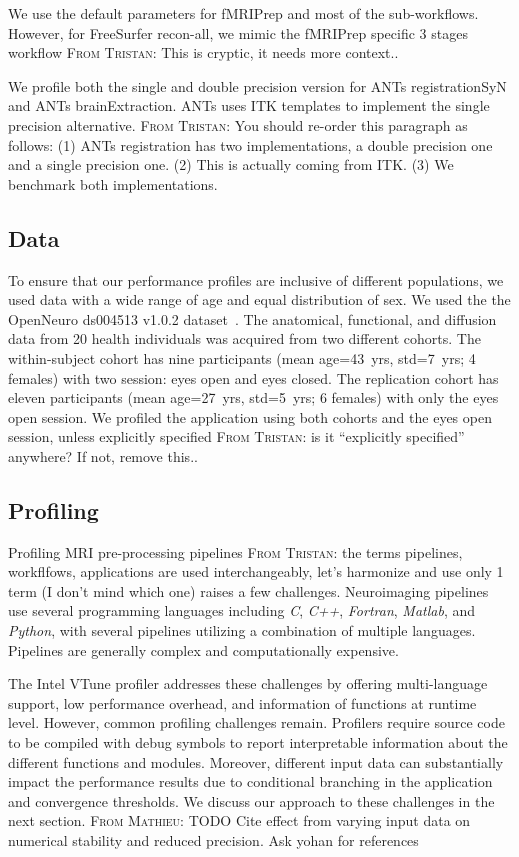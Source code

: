 \documentclass[conference]{IEEEtran}
\newcommand{\TG}[1]{\color{blue}\textsc{From Tristan: }#1\color{black}}
\newcommand{\MD}[1]{\color{magenta}\textsc{From Mathieu: }#1\color{black}}
\begin{document}
We use the default parameters for fMRIPrep and most of the sub-workflows. However, for FreeSurfer recon-all, we mimic the fMRIPrep specific 3 stages workflow \TG{This is cryptic, it needs more context.}.

We profile both the single and double precision version for ANTs registrationSyN and ANTs brainExtraction. ANTs uses ITK templates to implement the single precision alternative. \TG{You should re-order this paragraph as follows: (1) ANTs registration has two implementations, a double precision one and a single precision one. (2) This is actually coming from ITK. (3) We benchmark both implementations.}

\subsection{Data}
To ensure that our performance profiles are inclusive of different populations, we used data with a wide range of age and equal distribution of sex. We used the the OpenNeuro ds004513 v1.0.2 dataset~\cite{ds004513:1.0.2}. The anatomical, functional, and diffusion data from 20 health individuals was acquired from two different cohorts. The within-subject cohort has nine participants (mean age=43~yrs, std=7~yrs; 4 females) with two session: eyes open and eyes closed. The replication cohort has eleven participants (mean age=27~yrs, std=5~yrs; 6 females) with only the eyes open session. We profiled the application using both cohorts and the eyes open session, unless explicitly specified \TG{is it ``explicitly specified'' anywhere? If not, remove this.}.

\subsection{Profiling}
Profiling MRI pre-processing pipelines \TG{the terms pipelines, workflfows, applications are used interchangeably, let's harmonize and use only 1 term (I don't mind which one)} raises a few challenges. Neuroimaging pipelines use several programming languages including \textit{C}, \textit{C++}, \textit{Fortran}, \textit{Matlab}, and \textit{Python}, with several pipelines utilizing a combination of multiple languages. Pipelines are generally complex and computationally expensive.

The Intel VTune profiler addresses these challenges by offering multi-language support, low performance overhead, and information of functions at runtime level. However, common profiling challenges remain. Profilers require source code to be compiled with debug symbols to report interpretable information about the different functions and modules. Moreover, different input data can substantially impact the performance results due to conditional branching in the application and convergence thresholds. We discuss our approach to these challenges in the next section.
\MD{TODO Cite effect from varying input data on numerical stability and reduced precision. Ask yohan for references}
		
\end{document}

